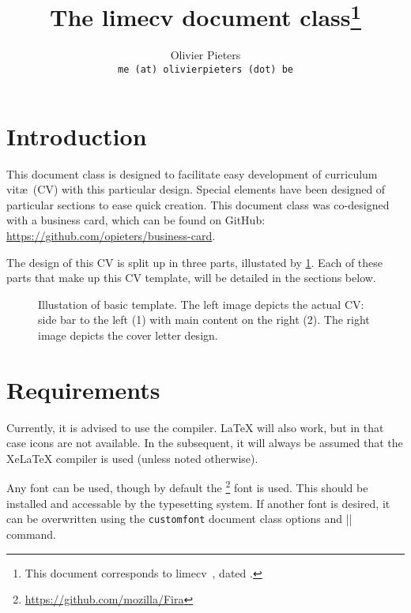 \documentclass{ltxdoc}
\title{The \textsf{limecv} document class\thanks{This document corresponds to \textsf{limecv}~\fileversion, dated \filedate.}}
\author{Olivier Pieters \\ \texttt{me (at) olivierpieters (dot) be}}
\begin{document}
\maketitle

\section{Introduction}

This document class is designed to facilitate easy development of curriculum vit\ae\ (CV) with this particular design. Special elements have been designed of particular sections to ease quick creation. This document class was co-designed with a business card, which can be found on GitHub: \url{https://github.com/opieters/business-card}.

The design of this CV is split up in three parts, illustated by \cref{design}. Each of these parts that make up this CV template, will be detailed in the sections below.

\begin{figure}[!ht]
  \centering
  \hspace{2cm}%
  \caption{Illustation of basic template. The left image depicts the actual CV: side bar to the left (1) with main content on the right (2). The right image depicts the cover letter design.}
  \label{design}
\end{figure}

\section{Requirements}

  Currently, it is advised to use the  compiler. LaTeX will also work, but in that case icons are not available. In the subsequent, it will always be assumed that the XeLaTeX compiler is used (unless noted otherwise). 

  Any font can be used, though by default the \footnote{\url{https://github.com/mozilla/Fira}} font is used. This should be installed and accessable by the typesetting system. If another font is desired, it can be overwritten using the \lstinline|customfont| document class options and |\cvMainFont| command. 
\end{document}
